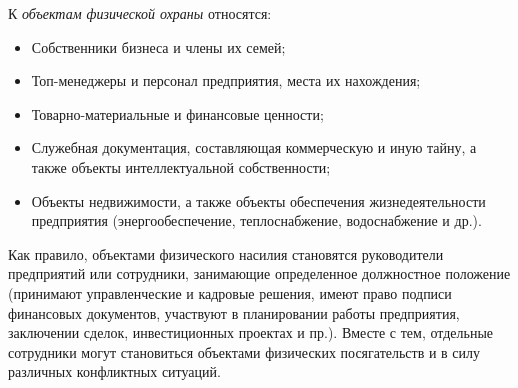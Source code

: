 \documentclass[a4paper,12pt,fleqn]{article} %
\begin{document}
К \textit{объектам физической охраны} относятся:
\begin{itemize}
	\item Собственники бизнеса и члены их семей;
	\item Топ-менеджеры и персонал предприятия, места их нахождения;
	\item Товарно-материальные и финансовые ценности;
	\item Служебная документация, составляющая коммерческую и иную тайну, а также объекты интеллектуальной собственности;
	\item Объекты недвижимости, а также объекты обеспечения жизнедеятельности предприятия (энергообеспечение, теплоснабжение, водоснабжение и др.).
\end{itemize}

Как правило, объектами физического насилия стано­вятся руководители предприятий или сотрудники, зани­мающие определенное должностное положение (принимают управленческие и кадровые решения, имеют право подписи финансовых документов, участвуют в пла­нировании работы предприятия, заключении сделок, ин­вестиционных проектах и пр.). Вместе с тем, отдельные сотрудники могут становиться объектами физических посягательств и в силу различных конфликтных ситуаций.\\
\end{document}
